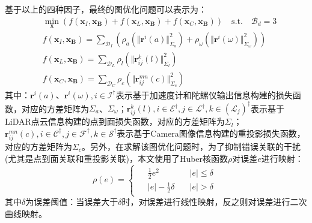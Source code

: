 基于以上的四种因子，最终的图优化问题可以表示为：
\begin{equation}
  \begin{aligned}
     & \min_{\boldsymbol{x}}\left(
    f(\boldsymbol{x}_I,\boldsymbol{x_B}) +
    f(\boldsymbol{x}_L,\boldsymbol{x_B}) +
    f(\boldsymbol{x}_C,\boldsymbol{x_B})
    \right)  \quad\mathrm{s.t.}\quad	\mathcal{B}_d=3                                                                                     \\
     & f(\boldsymbol{x}_I,\boldsymbol{x_B})=\sum_{\mathcal{D}_I}\left( \rho_a\left( \Vert\boldsymbol{r}^i(a)\Vert^2_{\Sigma_a}\right) +
    \rho_\omega\left( \Vert\boldsymbol{r}^i(\omega)\Vert^2_{\Sigma_\omega}\right) \right)                                               \\
     & f(\boldsymbol{x}_L,\boldsymbol{x_B})=\sum_{\mathcal{D}_L}\rho_l\left( \Vert\boldsymbol{r}_{ij}^k(l)\Vert^2_{\Sigma_l}\right)     \\
     & f(\boldsymbol{x}_C,\boldsymbol{x_B})=\sum_{\mathcal{D}_C}\rho_c\left( \Vert\boldsymbol{r}_{ij}^{mn}(c)\Vert^2_{\Sigma_c}\right)
  \end{aligned}
\end{equation}
其中：$\boldsymbol{r}^i(a)$、$\boldsymbol{r}^i(\omega),i\in\mathcal{I}^\dagger$表示基于加速度计和陀螺仪输出信息构建的损失函数，对应的方差矩阵为$\Sigma_a$、$\Sigma_\omega$；$\boldsymbol{r}_{ij}^k(l),i\in\mathcal{E}^\dagger
  ,j\in\mathcal{L}^\dagger,k\in(\mathcal{L}_j)^\dagger$表示基于LiDAR点云信息构建的点到面损失函数，对应的方差矩阵为$\Sigma_l$；$\boldsymbol{r}_{ij}^{mn}(c),i\in\mathcal{C}^\dagger,j\in\mathcal{F}^\dagger,k\in\mathcal{S}^\dagger$表示基于Camera图像信息构建的重投影损失函数，对应的方差矩阵为$\Sigma_c$。另外，在求解该图优化问题时，为了抑制错误关联的干扰(尤其是点到面关联和重投影关联)，本文使用了Huber核函数$\rho$对误差$e$进行映射：
\begin{equation}
  \rho(e)=\begin{cases}
    \begin{aligned}
       & \frac{1}{2}e^2\quad                 & \vert e\vert\le\delta \\
       & \vert e\vert-\frac{1}{2}\delta\quad & \vert e\vert>\delta
    \end{aligned}
  \end{cases}
\end{equation}
其中$\delta$为误差阈值：当误差大于$\delta$时，对误差进行线性映射，反之则对误差进行二次曲线映射。